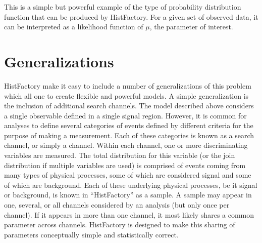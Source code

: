 
This is a simple but powerful example of the type of probability distribution function that can be produced by HistFactory.
For a given set of observed data, it can be interpreted as a likelihood function of $\mu$, the parameter of interest.



\section{Generalizations}

HistFactory make it easy to include a number of generalizations of this problem which all one to create flexible and powerful models.
A simple generalization is the inclusion of additional search channels.
The model described above considers a single observable defined in a single signal region.
However, it is common for analyses to define several categories of events defined by different criteria for the purpose of making a measurement.
Each of these categories is known as a search channel, or simply a channel.
Within each channel, one or more discriminating variables are measured.
The total distribution for this variable (or the join distribution if multiple variables are used) is comprised of events coming from many types of physical processes, 
some of which are considered signal and some of which are background.
Each of these underlying physical processes, be it signal or background, is known in ``HistFactory'' as a sample.
A sample may appear in one, several, or all channels considered by an analysis (but only once per channel).
If it appears in more than one channel, it most likely shares a common parameter across channels.
HistFactory is designed to make this sharing of parameters conceptually simple and statistically correct.

